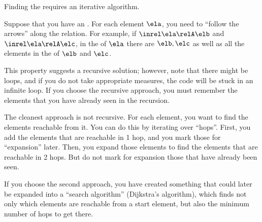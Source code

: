 
\begin{hint}
    Finding the  requires an iterative algorithm.

    Suppose that you have an  \relA.
    For each element $\ela$, you need to ``follow the arrows'' along the relation.
    For example, if $\inrel \ela \relA \elb$ and $\inrel \ela \relA \elc$, in the  of $\ela$ there are $\elb, \elc$ as well as all the elements in the  of $\elb$ and $\elc$.

    This property suggests a recursive solution; however, note that there might be loops, and if you do not take appropriate measures, the code will be stuck in an infinite loop.
    If you choose the recursive approach, you must remember the elements that you have already seen in the recursion.

    The cleanest approach is not recursive.
    For each element, you want to find the elements reachable from it.
    You can do this by iterating over ``hops''.
    First, you add the elements that are reachable in 1 hop, and you mark those for ``expansion'' later.
    Then, you expand those elements to find the elements that are reachable in 2 hops.
    But do not mark for expansion those that have already been seen.

    If you choose the second approach, you have created something that could later be expanded into a ``search algorithm'' (Dijkstra's algorithm), which finds not only which elements are reachable from a start element, but also the minimum number of hops to get there.
\end{hint}

